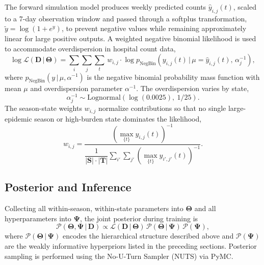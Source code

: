 \documentclass[11pt]{article}
\newcommand{\given}{\,|\,}
\newcommand{\Lognormal}{\text{Lognormal}}
\newcommand{\NegBin}{\text{NegBin}}
\begin{document}
The forward simulation model produces weekly predicted counts $\hat{y}_{i,j}(t)$, scaled to a 7-day observation window and passed through a softplus transformation, $\tilde{y} = \log(1 + e^y)$, to prevent negative values while remaining approximately linear for large positive outputs. A weighted negative binomial likelihood is used to accommodate overdispersion in hospital count data,
\begin{equation}
    \log \mathcal{L}(\bm{D} \given \bm{\Theta}) = \sum_{i}\sum_{j}\sum_{t}\, w_{i,j} \cdot \log p_{\NegBin}\!\left(y_{i,j}(t) \given \mu = \hat{y}_{i,j}(t),\, \alpha^{-1}_{j}\right),
\end{equation}
where $p_{\NegBin}(y \given \mu, \alpha^{-1})$ is the negative binomial probability mass function with mean $\mu$ and overdispersion parameter $\alpha^{-1}$. The overdispersion varies by state,
\begin{equation}
    \alpha^{-1}_j \sim \Lognormal\!\left(\log(0.0025),\ 1/25\right).
\end{equation}
The season-state weights $w_{i,j}$ normalize contributions so that no single large-epidemic season or high-burden state dominates the likelihood,
\begin{equation}
    w_{i,j} = \frac{\left(\max_{\{t\}} y_{i,j}(t)\right)^{-1}}{\dfrac{1}{|\bm{S}| \cdot |\bm{T}|} \displaystyle\sum_{i'}\sum_{j'} \left(\max_{\{t\}} y_{i',j'}(t)\right)^{-1}}.
\end{equation}
 
\subsection*{Posterior and Inference}
 
Collecting all within-season, within-state parameters into $\bm{\Theta}$ and all hyperparameters into $\bm{\Psi}$, the joint posterior during training is
\begin{equation}
    \mathcal{P}(\bm{\Theta}, \bm{\Psi} \given \bm{D}) \propto \mathcal{L}(\bm{D} \given \bm{\Theta})\, \mathcal{P}(\bm{\Theta} \given \bm{\Psi})\, \mathcal{P}(\bm{\Psi}),
\end{equation}
where $\mathcal{P}(\bm{\Theta} \given \bm{\Psi})$ encodes the hierarchical structure described above and $\mathcal{P}(\bm{\Psi})$ are the weakly informative hyperpriors listed in the preceding sections. Posterior sampling is performed using the No-U-Turn Sampler (NUTS) via PyMC.
 
\end{document}
